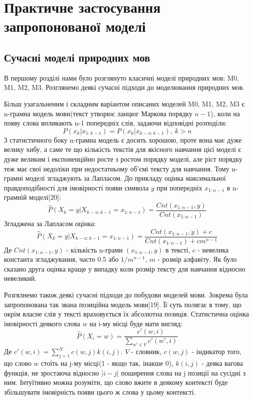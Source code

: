 \chapter{Практичне застосування запропонованої моделі}

\label{chap:practice}
\section{Сучасні моделі природних мов}
В першому розділі нами було розглянуто класичні моделі природних мов: M0, M1, M2, M3. Розглянемо деякі сучасні підходи до моделювання природних мов.

Більш узагальненим і складним варіантом описаних моделей M0, M1, M2, M3 є n-грамна модель мови(текст утворює ланцюг Маркова порядку $n-1$), коли на появу слова впливають n-1 попередніх слів, задаючи відповідні розподіли:
$$ P(x_k | x_{1:k-1}) = P(x_k | x_{k-n:k-1}),\ k > n $$
З статистичного боку n-грамна модель є досить хорошою, проте вона має дуже велику хибу, а саме те що кількість текстів для якісного навчання цієї моделі є дуже великим і експоненційно росте з ростом порядку моделі, але ріст порядку теж має свої недоліки при недостатньому об'ємі тексту для навчання. Тому n-грамні моделі згладжують за Лапласом. До прикладу оцінка максимальної правдоподібності для імовірності появи символа $y$ при попередніх $x_{1:n-1}$ в n-грамній моделі[20]:
$$ \hat{P}(X_k = y | X_{k-n:k-1} = x_{1:n-1}) = \frac{Cnt(x_{1:n-1},y)}{Cnt(x_{1:n-1})} $$
Згладжена за Лапласом оцінка:
$$ \hat{P}(X_k = y | X_{k-n:k-1} = x_{1:n-1}) = \frac{Cnt(x_{1:n-1},y) + c}{Cnt(x_{1:n-1}) + cm^{n-1}} $$
Де $Cnt(x_{1:n-1},y)$ - кількість n-грами $(x_{1:n-1},y)$ в тексті, $c$  - невелика константа згладжування, часто 0.5 або $1/m^{n-1}$, $m$ - розмір алфавіту.
Як було сказано друга оцінка краще у випадку коли розмір тексту для навчання відносно невеликий.

Розгялнемо також деякі сучасні підходи до побудови моделей мови. Зокрема була запропонована так звана позиційна модель мови[19]. Її суть полягає в тому, що окрім власне слів у тексті враховується їх абсолютна позиція. Статистична оцінка імовірності деякого слова $w$ на i-му місці буде мати вигляд:
$$ \hat{P}(X_i = w) = \frac{c'(w, i)}{\sum_{w' \in V} c'(w', i)} $$
Де $ c'(w, i) = \sum_{j=1}^{N} c(w,j) k(i,j) $. $V$ - словник, $c(w,j)$ - індикатор того, що слово $w$ стоїть на j-му місці(1 - якщо так, інакше 0), $k(i,j)$ - деяка вагова функція, не зростаюча відносно $|i-j|$ поширення слова на j позиції на сусідні з ним. Інтуїтивно можна розуміти, що слово вжите в деякому контексті буде збільшувати імовірність появи цього ж слова у цьому контексті.

